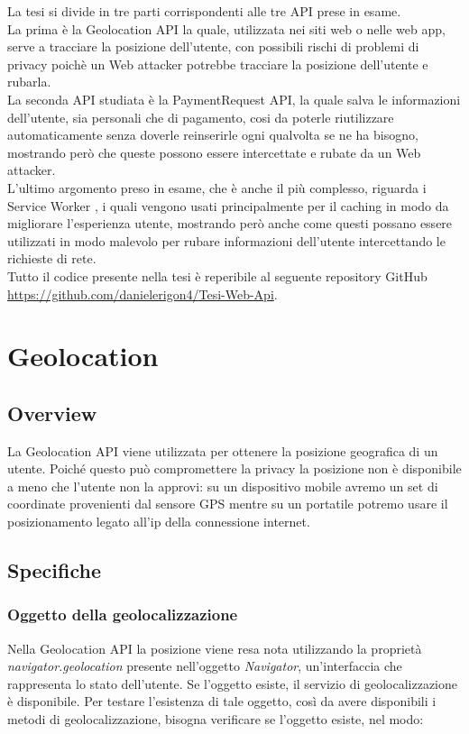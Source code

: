 \documentclass[11pt ,a4paper , twoside , openright ]{article}
\begin{document}
La tesi si divide in tre parti corrispondenti alle tre API prese in esame. 
\\
La prima è la Geolocation API la quale, utilizzata nei siti web o nelle web app, serve a tracciare la posizione dell'utente, con possibili rischi di problemi di privacy poichè un Web attacker potrebbe tracciare la posizione dell'utente e rubarla.
\\
La seconda API studiata è la PaymentRequest API, la quale salva le informazioni dell'utente, sia personali che di pagamento, cosi da poterle riutilizzare automaticamente senza doverle reinserirle ogni qualvolta se ne ha bisogno, mostrando però che queste possono essere intercettate e rubate da un Web attacker.
\\
L'ultimo argomento preso in esame, che è anche il più complesso, riguarda i Service Worker \cite{rif3}, i quali vengono usati principalmente per il caching in modo da migliorare l'esperienza utente, mostrando però anche come questi possano essere utilizzati in modo malevolo per rubare informazioni dell'utente intercettando le richieste di rete.
\\
Tutto il codice presente nella tesi è reperibile al seguente repository GitHub \url{https://github.com/danielerigon4/Tesi-Web-Api}.
\cleardoublepage


\section{Geolocation}
\subsection{Overview}
La Geolocation API viene utilizzata per ottenere la posizione geografica di un utente. 
Poiché questo può compromettere la privacy la posizione non è disponibile a meno che l'utente non la approvi: su un dispositivo mobile avremo un set di coordinate provenienti dal sensore GPS mentre su un portatile potremo usare il posizionamento legato all’ip della connessione internet.
\subsection{Specifiche}

\subsubsection{Oggetto della geolocalizzazione}
Nella Geolocation API la posizione viene resa nota utilizzando la proprietà \textit{navigator.geolocation} \cite{rif4} presente nell'oggetto \textit{Navigator}, un'interfaccia che rappresenta lo stato dell'utente. Se l'oggetto esiste, il servizio di geolocalizzazione è disponibile. Per testare l'esistenza di tale oggetto, così da avere disponibili i metodi di geolocalizzazione, bisogna verificare se l'oggetto esiste, nel modo:

\end{document}
